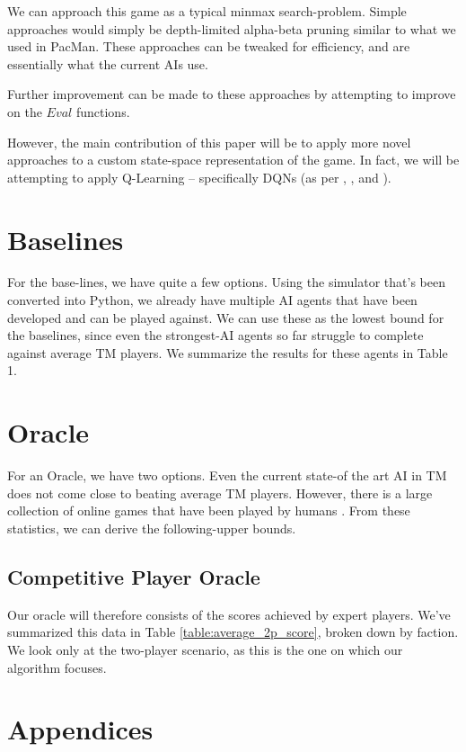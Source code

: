 \documentclass[10pt,twocolumn,letterpaper]{article}
\begin{document}
We can approach this game as a typical minmax search-problem. Simple approaches would simply be depth-limited alpha-beta pruning similar to what we used in PacMan. These approaches can be tweaked for efficiency, and are essentially what the current AIs use.

Further improvement can be made to these approaches by attempting to improve on the $Eval$ functions.

However, the main contribution of this paper will be to apply more novel approaches to a custom state-space representation of the game. In fact, we will be attempting to apply Q-Learning -- specifically DQNs (as per \cite{AlphaGo}, \cite{AlphaGoZero}, and \cite{AlphaZero}). 

\section{Baselines}
For the base-lines, we have quite a few options. Using the simulator that's been converted into Python, we already have multiple AI agents that have been developed and can be played against. We can use these as the lowest bound for the baselines, since even the strongest-AI agents so far struggle to complete against average TM players. We summarize the results for these agents in Table 1.

\section{Oracle}
For an Oracle, we have two options. Even the current state-of the art AI in TM does not come close to beating average TM players. However, there is a large collection of online games that have been played by humans \cite{TMStats}. From these statistics, we can derive the following-upper bounds.

\subsection{Competitive Player Oracle}
Our oracle will therefore consists of the scores achieved by expert players. We've summarized this data in Table \ref{table:average_2p_score}, broken down by faction. We look only at the two-player scenario, as this is the one on which our algorithm focuses.

\section{Appendices}
\end{document}
